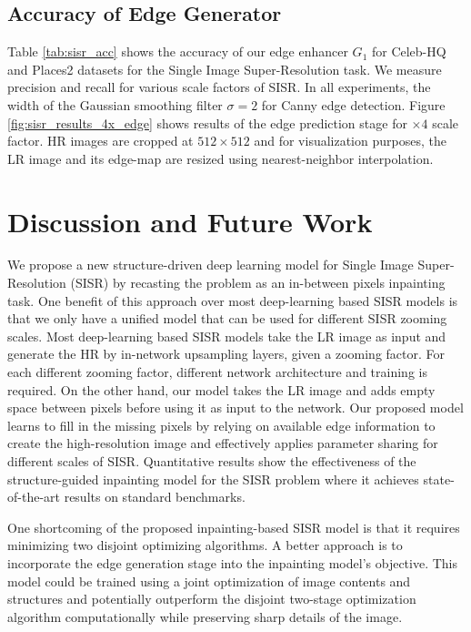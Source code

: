\documentclass[10pt,twocolumn,letterpaper]{article}
\begin{document}
\subsection{Accuracy of Edge Generator}
Table \ref{tab:sisr_acc} shows the accuracy of our edge enhancer $G_1$ for Celeb-HQ and Places2 datasets for the Single Image Super-Resolution task. We measure precision and recall for various scale factors of SISR. In all experiments, the width of the Gaussian smoothing filter $\sigma = 2$ for Canny edge detection. 
\newline
Figure \ref{fig:sisr_results_4x_edge} shows results of the edge prediction stage for $\times 4$ scale factor. HR images are cropped at $512 \times 512$ and for visualization purposes, the LR image and its edge-map are resized using nearest-neighbor interpolation.


\section{Discussion and Future Work}
We propose a new structure-driven deep learning model for Single Image Super-Resolution (SISR) by recasting the problem as an in-between pixels inpainting task. One benefit of this approach over most deep-learning based SISR models is that we only have a unified model that can be used for different SISR zooming scales. Most deep-learning based SISR models take the LR image as input and generate the HR by in-network upsampling layers, given a zooming factor. For each different zooming factor, different network architecture and training is required. On the other hand, our model takes the LR image and adds empty space between pixels before using it as input to the network. Our proposed model learns to fill in the missing pixels by relying on available edge information to create the high-resolution image and effectively applies parameter sharing for different scales of SISR. Quantitative results show the effectiveness of the structure-guided inpainting model for the SISR problem where it achieves state-of-the-art results on standard benchmarks. 

One shortcoming of the proposed inpainting-based SISR model is that it requires minimizing two disjoint optimizing algorithms. A better approach is to incorporate the edge generation stage into the inpainting model's objective. This model could be trained using a joint optimization of image contents and structures and potentially outperform the disjoint two-stage optimization algorithm computationally while preserving sharp details of the image. 
\end{document}
